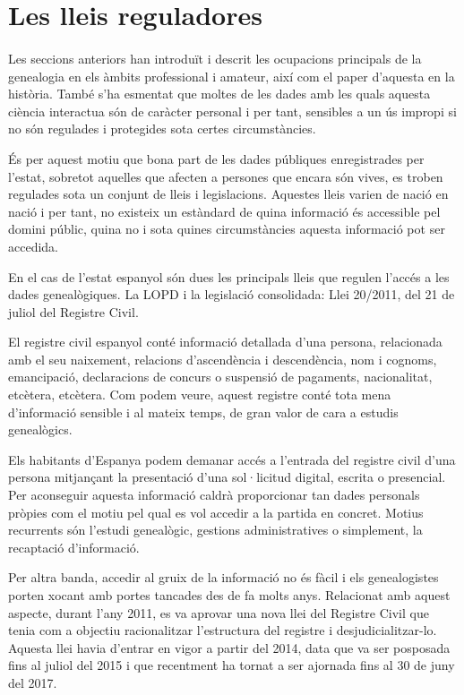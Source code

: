 \section{Les lleis reguladores}

    \paragraph{}
    Les seccions anteriors han introduït i descrit les ocupacions principals de la genealogia en els àmbits professional i amateur, així com el paper d'aquesta en la història. També s'ha esmentat que moltes de les dades amb les quals aquesta ciència interactua són de caràcter personal i per tant, sensibles a un ús impropi si no són regulades i protegides sota certes circumstàncies.

    És per aquest motiu que bona part de les dades públiques enregistrades per l’estat, sobretot aquelles que afecten a persones que encara són vives, es troben regulades sota un conjunt de lleis i legislacions. Aquestes lleis varien de nació en nació i per tant, no existeix un estàndard de quina informació és accessible pel domini públic, quina no i sota quines circumstàncies aquesta informació pot ser accedida.

    En el cas de l’estat espanyol són dues les principals lleis que regulen l’accés a les dades genealògiques. La \gls{LOPD} i la legislació consolidada: Llei 20/2011, del 21 de juliol del Registre Civil.

    El registre civil espanyol conté informació detallada d'una persona, relacionada amb el seu naixement, relacions d’ascendència i descendència, nom i cognoms, emancipació, declaracions de concurs o suspensió de pagaments, nacionalitat, etcètera, etcètera.  Com podem veure, aquest registre conté tota mena d’informació sensible i al mateix temps, de gran valor de cara a estudis genealògics.

    Els habitants d'Espanya podem demanar accés a l'entrada del registre civil d'una persona mitjançant la presentació d'una sol·licitud digital, escrita o presencial. Per aconseguir aquesta informació caldrà proporcionar tan dades personals pròpies com el motiu pel qual es vol accedir a la partida en concret. Motius recurrents són l'estudi genealògic, gestions administratives o simplement, la recaptació d'informació.

    Per altra banda, accedir al gruix de la informació no és fàcil i els genealogistes porten xocant amb portes tancades des de fa molts anys. Relacionat amb aquest aspecte, durant l'any 2011, es va aprovar una nova llei del Registre Civil que tenia com a objectiu racionalitzar l'estructura del registre i desjudicialitzar-lo. Aquesta llei havia d'entrar en vigor a partir del 2014, data que va ser posposada fins al juliol del 2015 i que recentment ha tornat a ser ajornada fins al 30 de juny del 2017.

